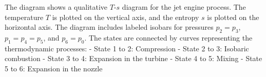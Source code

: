 The diagram shows a qualitative \( T \)-\( s \) diagram for the jet engine process. The temperature \( T \) is plotted on the vertical axis, and the entropy \( s \) is plotted on the horizontal axis. The diagram includes labeled isobars for pressures \( p_2 = p_3 \), \( p_1 = p_4 = p_5 \), and \( p_6 = p_0 \). The states are connected by curves representing the thermodynamic processes:  
- State 1 to 2: Compression  
- State 2 to 3: Isobaric combustion  
- State 3 to 4: Expansion in the turbine  
- State 4 to 5: Mixing  
- State 5 to 6: Expansion in the nozzle
